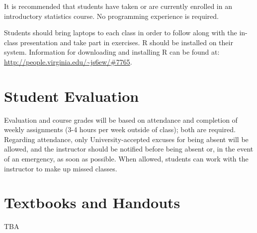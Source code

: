 \documentclass[11pt]{article}
\begin{document}
It is recommended that students have taken or are currently enrolled in an introductory statistics course.  No programming experience is required.

Students should bring laptops to each class in order to follow along with the in-class presentation and take part in exercises.  R should be installed on their system.  Information for downloading and installing R can be found at: \url{http://people.virginia.edu/~js6ew/#7765}.

\section{Student Evaluation}

Evaluation and course grades will be based on attendance and completion of weekly assignments (3-4 hours per week outside of class); both are required.  Regarding attendance, only University-accepted excuses for being absent will be allowed, and the instructor should be notified before being absent or, in the event of an emergency, as soon as possible.  When allowed, students can work with the instructor to make up missed classes.

\section{Textbooks and Handouts}

TBA

\pagebreak
\end{document}
